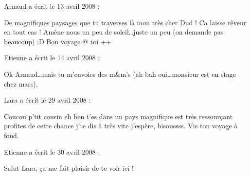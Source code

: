 \medskip
Arnaud a écrit le 13 avril 2008 :
\begin{displayquote}
De magnifiques paysages que tu traverses là mon très cher Dud ! Ca laisse rêveur en tout cas !
Amène nous un peu de soleil\dots juste un peu (on demande pas beaucoup) :D
Bon voyage @ toi
++
\end{displayquote}

\medskip
Etienne a écrit le 14 avril 2008 :
\begin{displayquote}
Ok Arnaud\dots mais tu m'envoies des m\&m's (ah bah oui\dots monsieur est en stage chez mars).
\end{displayquote}

\medskip
Lara a écrit le 29 avril 2008 :
\begin{displayquote}
Coucou p'tit cousin eh ben t'es dans un pays magnifique est très ressourçant profites de cette chance j'te dis à très vite j'espère, bisoussss. Vis ton voyage à fond.
\end{displayquote}

\medskip
Etienne a écrit le 30 avril 2008 :
\begin{displayquote}
Salut Lara, ça me fait plaisir de te voir ici !
\end{displayquote}

\vfill
